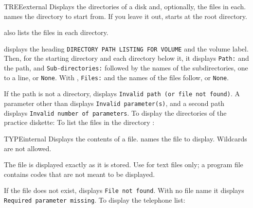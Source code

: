 \begin{DosEntry}{TREE}{}{external}
\Purpose Displays the directories of a disk and, optionally, the files in
each.
\Format {}
\Remarks
{} names the directory to start from.  If you leave it out,
 starts at the root directory.

 also lists the files in each directory.

 displays the heading \texttt{DIRECTORY PATH LISTING FOR VOLUME}
and the volume label.  Then, for the starting directory and each directory
below it, it displays \texttt{Path:} and the path, and
\texttt{Sub-directories:} followed by the names of the subdirectories, one
to a line, or \texttt{None}.  With , \texttt{Files:} and the names
of the files follow, or \texttt{None}.

If the path is not a directory,  displays \texttt{Invalid path
(or file not found)}.  A parameter other than  displays
\texttt{Invalid parameter(s)}, and a second path displays \texttt{Invalid
number of parameters}.
\Example
To display the directories of the practice diskette:
To list the files in the directory :
\end{DosEntry}

\begin{DosEntry}{TYPE}{}{internal}
\Purpose Displays the contents of a file.
\Format {}
\Remarks
{} names the file to display.  Wildcards are not allowed.

The file is displayed exactly as it is stored.  Use  for text
files only; a program file contains codes that are not meant to be
displayed.

If the file does not exist,  displays \texttt{File not found}.
With no file name it displays \texttt{Required parameter missing}.
\Example
To display the telephone list:
\end{DosEntry}

